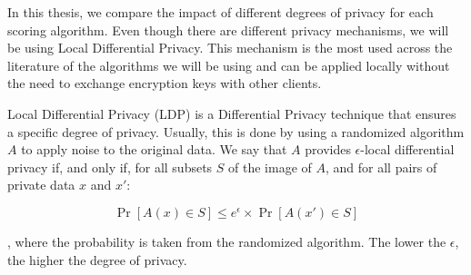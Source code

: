 In this thesis, we compare the impact of different degrees of privacy for each scoring algorithm. Even though there are different privacy mechanisms, we will be using Local Differential Privacy. This mechanism is the most used across the literature of the algorithms we will be using and can be applied locally without the need to exchange encryption keys with other clients.

Local Differential Privacy (LDP) is a Differential Privacy technique that ensures a specific degree of privacy. Usually, this is done by using a randomized algorithm $A$ to apply noise to the original data. We say that $A$ provides $\epsilon$-local differential privacy if, and only if, for all subsets $S$ of the image of $A$, and for all pairs of private data $x$ and $x'$:

\begin{equation}
    \label{eq:e-ldp}
    \Pr[A(x) \in S] \leq e^\epsilon \times \Pr[A(x') \in S]
\end{equation}

, where the probability is taken from the randomized algorithm. The lower the $\epsilon$, the higher the degree of privacy.
